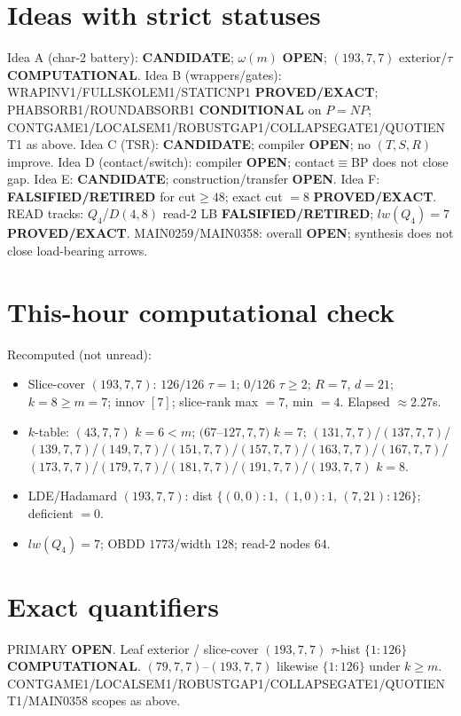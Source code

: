 \documentclass[11pt]{article}
\begin{document}
\section*{Ideas with strict statuses}
Idea A (char-2 battery): \textbf{CANDIDATE}; $\omega(m)$ \textbf{OPEN}; $(193,7,7)$ exterior/$\tau$ \textbf{COMPUTATIONAL}.
Idea B (wrappers/gates): WRAPINV1/FULLSKOLEM1/STATICNP1 \textbf{PROVED/EXACT};
PHABSORB1/ROUNDABSORB1 \textbf{CONDITIONAL} on $P=NP$;
CONTGAME1/LOCALSEM1/ROBUSTGAP1/COLLAPSEGATE1/QUOTIENT1 as above.
Idea C (TSR): \textbf{CANDIDATE}; compiler \textbf{OPEN}; no $(T,S,R)$ improve.
Idea D (contact/switch): compiler \textbf{OPEN}; contact$\equiv$BP does not close gap.
Idea E: \textbf{CANDIDATE}; construction/transfer \textbf{OPEN}.
Idea F: \textbf{FALSIFIED/RETIRED} for cut$\ge48$; exact cut $=8$ \textbf{PROVED/EXACT}.
READ tracks: $Q_4$/$D(4,8)$ read-$2$ LB \textbf{FALSIFIED/RETIRED}; $lw(Q_4)=7$ \textbf{PROVED/EXACT}.
MAIN0259/MAIN0358: overall \textbf{OPEN}; synthesis does not close load-bearing arrows.

\section*{This-hour computational check}
Recomputed (not unread):
\begin{itemize}
\item Slice-cover $(193,7,7)$: $126/126$ $\tau{=}1$; $0/126$ $\tau{\ge}2$; $R{=}7$, $d{=}21$;
  $k{=}8{\ge}m{=}7$; innov $[7]$; slice-rank max $=7$, min $=4$. Elapsed $\approx2.27$s.
\item $k$-table: $(43,7,7)$ $k{=}6{<}m$; $(67$--$127,7,7)$ $k{=}7$;
  $(131,7,7)$/$(137,7,7)$/$(139,7,7)$/$(149,7,7)$/$(151,7,7)$/$(157,7,7)$/$(163,7,7)$/$(167,7,7)$/$(173,7,7)$/$(179,7,7)$/$(181,7,7)$/$(191,7,7)$/$(193,7,7)$ $k{=}8$.
\item LDE/Hadamard $(193,7,7)$: dist $\{(0,0){:}1,\,(1,0){:}1,\,(7,21){:}126\}$; deficient $=0$.
\item $lw(Q_4)=7$; OBDD $1773$/width $128$; read-$2$ nodes $64$.
\end{itemize}

\section*{Exact quantifiers}
PRIMARY \textbf{OPEN}. Leaf exterior / slice-cover $(193,7,7)$ $\tau$-hist $\{1{:}126\}$ \textbf{COMPUTATIONAL}.
$(79,7,7)$--$(193,7,7)$ likewise $\{1{:}126\}$ under $k{\ge}m$. CONTGAME1/LOCALSEM1/ROBUSTGAP1/COLLAPSEGATE1/QUOTIENT1/MAIN0358 scopes as above.
\end{document}
